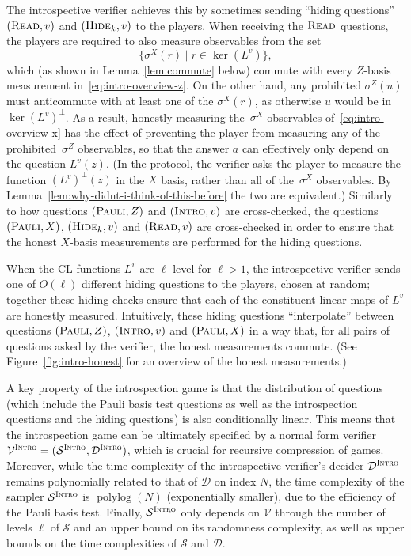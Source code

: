 \documentclass[11pt]{article}
\theoremstyle{definition}
\DeclareMathOperator{\polylog}{polylog}
\newcommand{\sampler}{\mathcal{S}}
\newcommand{\decider}{\mathcal{D}}
\newcommand{\verifier}{\mathcal{V}}
\newcommand{\gamestyle}[1]{\ensuremath{\textsc{#1}}\xspace}
\newcommand{\intro}{\gamestyle{Intro}}
\newcommand{\trole}{\ensuremath{v}} %
\newcommand{\typestyle}[1]{\ensuremath{\textsc{#1}}\xspace}
\newcommand{\Pauli}{\typestyle{Pauli}}
\newcommand{\Read}{\typestyle{Read}}
\newcommand{\Hide}[1]{\typestyle{Hide}_{#1}}
\newcommand{\Introspect}{\typestyle{Intro}}
\begin{document}
The introspective verifier achieves this by sometimes sending ``hiding
questions'' $(\Read, \trole)$ and $(\Hide{k}, \trole)$ to the players.
When receiving the $\Read$ questions, the players are required to also measure
observables from the set
\begin{equation}
  \label{eq:intro-overview-x}
  \{\sigma^X(r) \mid r \in \ker(L^\trole)\},
\end{equation}
which (as shown in Lemma~\ref{lem:commute} below) commute with every $Z$-basis
measurement in~\eqref{eq:intro-overview-z}.
On the other hand, any prohibited $\sigma^Z(u)$ must anticommute with at least
one of the $\sigma^X(r)$, as otherwise $u$ would be in $\ker(L^\trole)^\perp$.
As a result, honestly measuring the~$\sigma^X$ observables
of~\eqref{eq:intro-overview-x} has the effect of preventing the player from
measuring any of the prohibited~$\sigma^Z$ observables, so that the answer $a$
can effectively only depend on the question $L^\trole(z)$.
(In the protocol, the verifier asks the player to measure the function
$(L^\trole)^\perp(z)$ in the $X$ basis, rather than all of the~$\sigma^X$
observables.
By Lemma~\ref{lem:why-didnt-i-think-of-this-before} the two are equivalent.)
Similarly to how questions $(\Pauli, Z)$ and $(\Introspect, \trole)$ are
cross-checked, the questions $(\Pauli, X)$, $(\Hide{k}, \trole)$ and $(\Read,
\trole)$ are cross-checked in order to ensure that the honest $X$-basis
measurements are performed for the hiding questions.

When the CL functions $L^\trole$ are $\ell$-level for $\ell > 1$, the
introspective verifier sends one of $O(\ell)$ different hiding questions to the
players, chosen at random; together these hiding checks ensure that each of the
constituent linear maps of $L^\trole$ are honestly measured.
Intuitively, these hiding questions ``interpolate'' between questions
$(\Pauli,Z)$, $(\Introspect,\trole)$ and $(\Pauli,X)$ in a way that, for all
pairs of questions asked by the verifier, the honest measurements commute.
(See Figure~\ref{fig:intro-honest} for an overview of the honest measurements.)

A key property of the introspection game is that the distribution of questions
(which include the Pauli basis test questions as well as the introspection
questions and the hiding questions) is also conditionally linear.
This means that the introspection game can be ultimately specified by a normal
form verifier $\verifier^\intro = (\sampler^\intro,\decider^\intro)$, which is
crucial for recursive compression of games.
Moreover, while the time complexity of the introspective verifier's decider
$\decider^\intro$ remains polynomially related to that of $\decider$ on index
$N$, the time complexity of the sampler $\sampler^\intro$ is $\polylog(N)$
(exponentially smaller), due to the efficiency of the Pauli basis test.
Finally, $\sampler^\intro$ only depends on $\verifier$ through the number of
levels $\ell$ of $\sampler$ and an upper bound on its randomness complexity, as
well as upper bounds on the time complexities of $\sampler$ and $\decider$.
\end{document}
